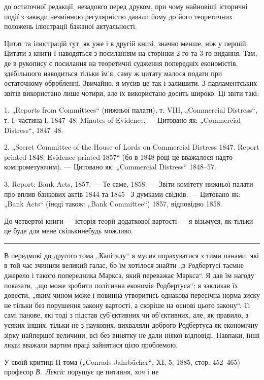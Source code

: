 \parcont{}  %
до остаточної редакції, незадовго перед друком, при чому найновіші
історичні події з завжди незмінною регулярністю давали
йому до його теоретичних положень ілюстрації бажаної актуальності.

Цитат та ілюстрацій тут, як уже і в другій книзі, значно
менше, ніж у першій. Цитати з книги І наводяться з посиланням
на сторінки 2-го та 3-го видання. Там, де в рукопису є
посилання на теоретичні судження попередніх економістів, здебільшого
наводиться тільки ім’я, саму ж цитату малося подати
при остаточному обробленні. Звичайно, я мусив це так і залишити.
З парламентських звітів використано лише чотири, але
їх використано досить широко. Ці звіти такі:

1. „Reports from Committees“ (нижньої палати), т. VIII, „Commercial
Distress“, т. І, частина І, 1847--48. Minutes of Evidence. —
Цитовано як: „Commercial Distress“, 1847--48.

2. „Secret Committee of the House of Lords on Commercial Distress
1847. Report printed 1848. Evidence printed 1857“ (бо в 1848 році
це вважалося надто компрометуючим). — Цитовано як: „Commercial
Distress“ 1848--57.

3. Report: Bank Acts, 1857. — Те саме, 1858. — Звіти комітету
нижньої палати про вплив банкових актів 1844 та 1845~
З думками свідків. — Цитовано як: „Bank Acts“ (іноді також:
„Bank Committee“) 1857, відповідно 1858.

До четвертої книги — історія теорії додаткової вартості —
я візьмуся, як тільки це буде для мене скількинебудь можливо.

\pfbreak

В передмові до другого тома „Капіталу“ я мусив порахуватися
з тими панами, які в той час зчинили великий галас, бо
їм хотілося знайти „в Родбертусі таємне джерело і такого попередника
Маркса, який переважає Маркса“. Я дав їм нагоду
показати, „що може зробити політична економія Родбертуса“;
я закликав їх довести, „яким чином може і повинна утворитись
однакова пересічна норма зиску не тільки без порушення закону
вартості, а скоріше на основі цього закону“. Ті самі панове,
які тоді з підстав суб’єктивних чи об’єктивних, але, як правило,
з усяких інших, тільки не з наукових, вихваляли доброго Родбертуса
як економічну зірку найпершої величини, всі без винятку
не дали ніякої відповіді. Навпаки, інші люди вважали
вартим праці зайнятися цією проблемою.

У своїй критиці II тома („Conrads Jahrbücher“, XI, 5, 1885,
стор. 452--465) професор \emph{В.~Лексіс} порушує це питання, хоч і не

\parbreak{}  %
